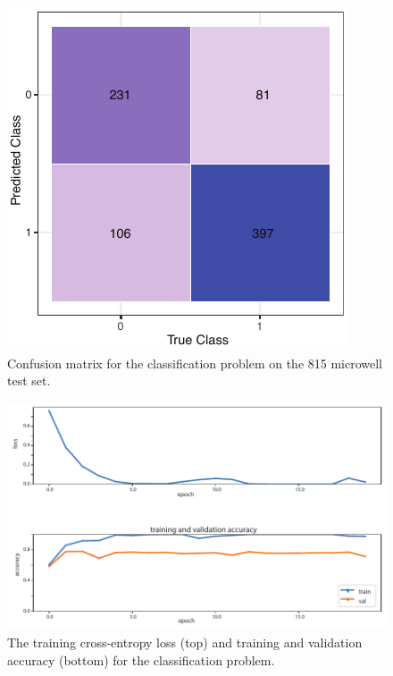 \documentclass[10pt,twocolumn,letterpaper]{article}
\begin{document}
  \begin{figure}[b!]
\begin{center}
 \includegraphics[width=0.9\linewidth]{figures/classification/test_set_confusion_matrix.pdf}
\end{center}
   \caption{Confusion matrix for the classification problem on the 815 microwell test set.}
\label{test_set_confusion_matrix}
\end{figure}

 \begin{figure}[t!]
\begin{center}
\includegraphics[width=0.8\linewidth]{figures/classification/classification_train_loss_train_and_val_loss.pdf}
\end{center}
   \caption{The training cross-entropy loss (top) and training and validation accuracy (bottom) for the classification problem.}
\label{classification_train_loss_train_and_val_loss}
\end{figure}
\end{document}
